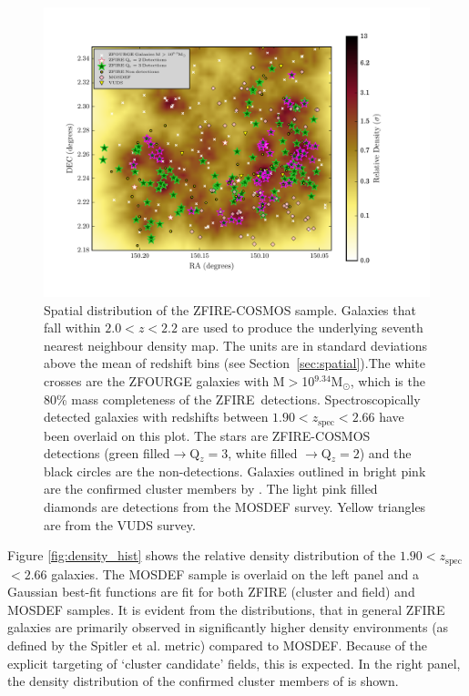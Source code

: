\documentclass[iop]{emulateapj}
\newcommand{\msol}{M$_\odot$}
\newcommand{\zspec}{$z_{\mathrm{spec}}$}
\begin{document}
\begin{figure}
\includegraphics[trim = 10 20 10 5, clip, scale=1.00]{figures/detection_map.pdf}
\caption{ Spatial distribution of the ZFIRE-COSMOS sample. 
Galaxies that fall within $2.0<z<2.2$ are used to produce the underlying seventh nearest neighbour density map. The units are in standard deviations above the mean of redshift bins (see Section~\ref{sec:spatial}).The white crosses are the ZFOURGE galaxies with M$>$10$^{9.34}$\msol, which is the 80\% mass completeness of the ZFIRE\ detections. 
Spectroscopically detected galaxies with redshifts between $1.90<z_\mathrm{spec}<2.66$ have been overlaid on this plot.
The stars are ZFIRE-COSMOS detections (green filled$\rightarrow$Q$_z=3$, white filled $\rightarrow$Q$_z=2$) and the black circles are the non-detections. Galaxies outlined in bright pink are the confirmed cluster members by \citet{Yuan2014}. 
The light pink filled diamonds are detections from the MOSDEF survey. Yellow triangles are from the VUDS survey.  
}
\label{fig:detection_map}
\end{figure}


Figure \ref{fig:density_hist} shows the relative density distribution of the $1.90<$\zspec$<2.66$ galaxies. The MOSDEF sample is overlaid on the left panel and a Gaussian best-fit functions are fit for both ZFIRE (cluster and field) and MOSDEF samples. It is evident from the distributions, that in general ZFIRE galaxies are primarily observed in significantly higher density environments (as defined by the Spitler et al. metric) compared to MOSDEF. 
Because of the explicit targeting of `cluster candidate' fields, this is expected. 
In the right panel, the density distribution of the confirmed
cluster members of \citet{Yuan2014} is shown. 
\end{document}
